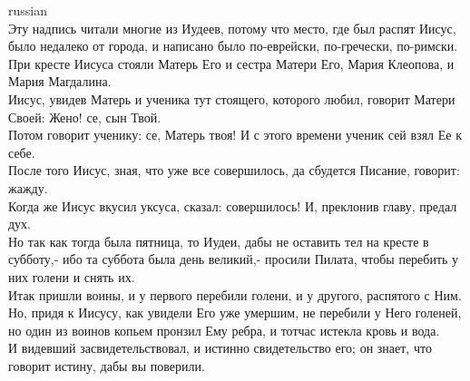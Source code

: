 \documentclass[10pt]{article} %
\begin{document}
{\begin{minipage}[t]{0.45\textwidth}
\begin{otherlanguage*}{russian}
\\
Эту надпись читали многие из Иудеев, потому что место, где был распят Иисус, было недалеко от города, и написано было по-еврейски, по-гречески, по-римски.
\\
При кресте Иисуса стояли Матерь Его и сестра Матери Его, Мария Клеопова, и Мария Магдалина.
\\
Иисус, увидев Матерь и ученика тут стоящего, которого любил, говорит Матери Своей: Жено! се, сын Твой.
\\
Потом говорит ученику: се, Матерь твоя! И с этого времени ученик сей взял Ее к себе.
\\
После того Иисус, зная, что уже все совершилось, да сбудется Писание, говорит: жажду.
\\
Когда же Иисус вкусил уксуса, сказал: совершилось! И, преклонив главу, предал дух.
\\
Но так как тогда была пятница, то Иудеи, дабы не оставить тел на кресте в субботу,- ибо та суббота была день великий,- просили Пилата, чтобы перебить у них голени и снять их.
\\
Итак пришли воины, и у первого перебили голени, и у другого, распятого с Ним.
\\
Но, придя к Иисусу, как увидели Его уже умершим, не перебили у Него голеней,
\\
но один из воинов копьем пронзил Ему ребра, и тотчас истекла кровь и вода.
\\
И видевший засвидетельствовал, и истинно свидетельство его; он знает, что говорит истину, дабы вы поверили.
\end{otherlanguage*}
\end{minipage}
\hfill
\begin{minipage}[t]{0.49\textwidth}


\end{minipage}}
\end{document}
